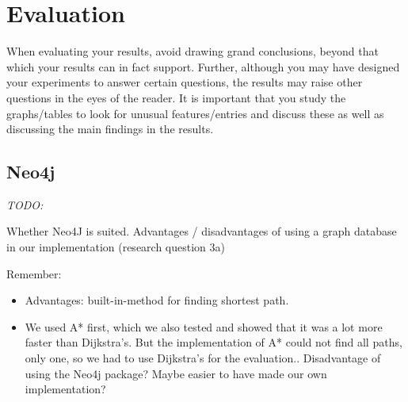 \section{Evaluation}

When evaluating your results, avoid drawing grand conclusions, beyond that which your results can in fact support. Further, although you may have designed your experiments to answer certain questions, the results may raise other questions in the eyes of the reader. It is important that you study the graphs/tables to look for unusual features/entries and discuss these as well as discussing the main findings in the results. 






\subsection{Neo4j}

\emph{\color{blue} TODO:}

Whether Neo4J is suited. Advantages / disadvantages of using a graph database in our implementation (research question 3a)

Remember:
\begin{itemize}
\item Advantages: built-in-method for finding shortest path.
\item We used A* first, which we also tested and showed that it was a lot more faster than Dijkstra's. But the implementation of A* could not find all paths, only one, so we had to use Dijkstra's for the evaluation.. Disadvantage of using the Neo4j package? Maybe easier to have made our own implementation?
\end{itemize}

